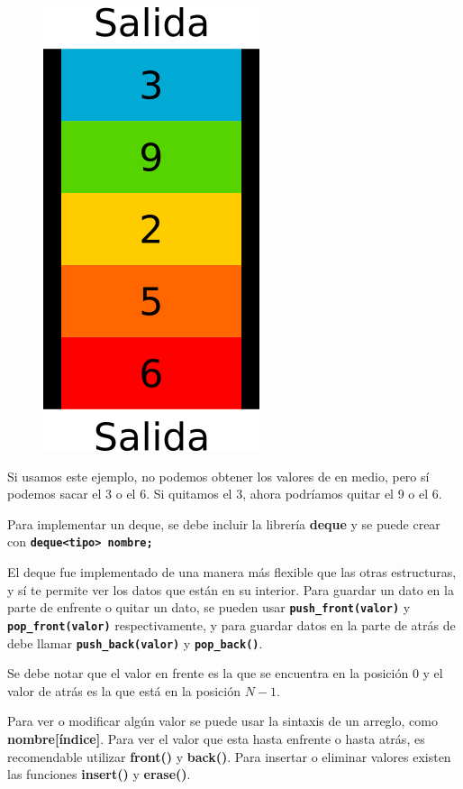 \documentclass{article}
\begin{document}
\begin{figure}[H]
    \centering
    \includegraphics[width=0.1\paperwidth]{deque}
\end{figure}

Si usamos este ejemplo, no podemos obtener los valores de en medio, pero sí podemos sacar el 3 o el 6. Si quitamos el 3, ahora podríamos quitar el 9 o el 6.

Para implementar un deque, se debe incluir la librería \textbf{deque} y se puede crear con \textbf{\lstinline{deque<tipo> nombre;}}

El deque fue implementado de una manera más flexible que las otras estructuras, y sí te permite ver los datos que están en su interior. Para guardar un dato en la parte de enfrente o quitar un dato, se pueden usar \textbf{\lstinline{push_front(valor)}} y \textbf{\lstinline{pop_front(valor)}} respectivamente, y para guardar datos en la parte de atrás de debe llamar \textbf{\lstinline{push_back(valor)}} y \textbf{\lstinline{pop_back()}}.

Se debe notar que el valor en frente es la que se encuentra en la posición 0 y el valor de atrás es la que está en la posición $N - 1$.

Para ver o modificar algún valor se puede usar la sintaxis de un arreglo, como \textbf{nombre[índice]}. Para ver el valor que esta hasta enfrente o hasta atrás, es recomendable utilizar \textbf{front()} y \textbf{back()}. Para insertar o eliminar valores existen las funciones \textbf{insert()} y \textbf{erase()}.
\end{document}
